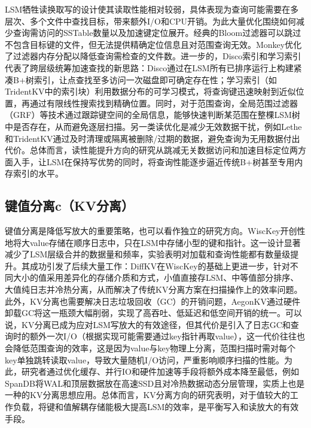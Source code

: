 \documentclass[lang=cn,11pt,a4paper]{elegantpaper}
\begin{document}
LSM牺牲读换取写的设计使其读取性能相对较弱，具体表现为查询可能需要在多层次、多个文件中查找目标，带来额外I/O和CPU开销。为此大量优化围绕如何减少查询需访问的SSTable数量以及加速键定位展开。经典的Bloom过滤器可以跳过不包含目标键的文件，但无法提供精确定位信息且对范围查询无效。Monkey优化了过滤器内存分配以降低查询需检查的文件数。进一步的，Disco索引和学习索引代表了跨层级统筹加速查找的新思路：Disco通过在LSM所有已排序运行上构建紧凑B+树索引，让点查找至多访问一次磁盘即可确定存在性；学习索引（如TridentKV中的索引块）利用数据分布的可学习模式，将查询键迅速映射到近似位置，再通过有限线性搜索找到精确位置。同时，对于范围查询，全局范围过滤器（GRF）等技术通过跟踪键空间的全局信息，能够快速判断某范围在整棵LSM树中是否存在，从而避免逐层扫描。另一类读优化是减少无效数据干扰，例如Lethe和TridentKV通过及时清理或隔离被删除/过期的数据，避免查询为无用数据付出代价。总体而言，读性能提升方向的研究从跳减无关数据访问和加速目标定位两方面入手，让LSM在保持写优势的同时，将查询性能逐步逼近传统B+树甚至专用内存索引的水平。

\subsection{键值分离c（KV分离）}
键值分离是降低写放大的重要策略，也可以看作独立的研究方向。WiscKey开创性地将大value存储在顺序日志中，只在LSM中存储小型的键和指针。这一设计显著减少了LSM层级合并的数据量和频率，实验表明对加载和查询性能都有数量级提升。其成功引发了后续大量工作：DiffKV在WiscKey的基础上更进一步，针对不同大小的值采用差异化的存储介质和方式，小值直接存LSM、中等值部分排序、大值纯日志并冷热分离，从而解决了传统KV分离方案在扫描操作上的效率问题。此外，KV分离也需要解决日志垃圾回收（GC）的开销问题，AegonKV通过硬件卸载GC将这一瓶颈大幅削弱，实现了高吞吐、低延迟和低空间开销的统一。可以说，KV分离已成为应对LSM写放大的有效途径，但其代价是引入了日志GC和查询时的额外一次I/O（根据实现可能需要通过key指针再取value），这一代价往往也会降低范围查询的效率，这是因为value与key物理上分离，范围扫描时需对每个key单独跳转读取value，导致大量随机I/O访问，严重影响顺序扫描的性能。为此，研究者通过优化缓存、并行IO和硬件加速等手段将额外成本降至最低，例如SpanDB将WAL和顶层数据放在高速SSD且对冷热数据动态分层管理，实质上也是一种的KV分离思想应用。总体而言，KV分离方向的研究表明，对于值较大的工作负载，将键和值解耦存储能极大提高LSM的效率，是平衡写入和读放大的有效手段。
\end{document}

